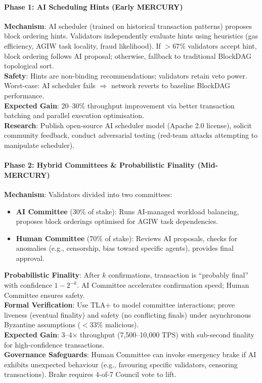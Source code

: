 \documentclass[11pt]{article}
\begin{document}
\paragraph{Phase 1: AI Scheduling Hints (Early MERCURY)}
\textbf{Mechanism}: AI scheduler (trained on historical transaction patterns) proposes block ordering hints. Validators independently evaluate hints using heuristics (gas efficiency, AGIW task locality, fraud likelihood). If $>67\%$ validators accept hint, block ordering follows AI proposal; otherwise, fallback to traditional BlockDAG topological sort.\\
\textbf{Safety}: Hints are non-binding recommendations; validators retain veto power. Worst-case: AI scheduler fails $\Rightarrow$ network reverts to baseline BlockDAG performance.\\
\textbf{Expected Gain}: 20--30\% throughput improvement via better transaction batching and parallel execution optimisation.\\
\textbf{Research}: Publish open-source AI scheduler model (Apache 2.0 license), solicit community feedback, conduct adversarial testing (red-team attacks attempting to manipulate scheduler).

\paragraph{Phase 2: Hybrid Committees \& Probabilistic Finality (Mid-MERCURY)}
\textbf{Mechanism}: Validators divided into two committees:
\begin{itemize}[noitemsep]
  \item \textbf{AI Committee} (30\% of stake): Runs AI-managed workload balancing, proposes block orderings optimised for AGIW task dependencies.
  \item \textbf{Human Committee} (70\% of stake): Reviews AI proposals, checks for anomalies (e.g., censorship, bias toward specific agents), provides final approval.
\end{itemize}
\textbf{Probabilistic Finality}: After $k$ confirmations, transaction is ``probably final'' with confidence $1 - 2^{-k}$. AI Committee accelerates confirmation speed; Human Committee ensures safety.\\
\textbf{Formal Verification}: Use TLA+ to model committee interactions; prove liveness (eventual finality) and safety (no conflicting finals) under asynchronous Byzantine assumptions ($<33\%$ malicious).\\
\textbf{Expected Gain}: 3--4$\times$ throughput (7,500--10,000 TPS) with sub-second finality for high-confidence transactions.\\
\textbf{Governance Safeguards}: Human Committee can invoke emergency brake if AI exhibits unexpected behaviour (e.g., favouring specific validators, censoring transactions). Brake requires 4-of-7 Council vote to lift.
\end{document}
